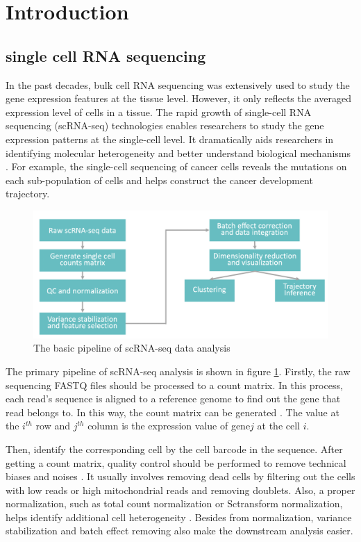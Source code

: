 \section{Introduction}

\subsection{single cell RNA sequencing}

In the past decades, bulk cell RNA sequencing was extensively used to study the gene expression features at the tissue level. However, it only reflects the averaged expression level of cells in a tissue. The rapid growth of single-cell RNA sequencing (scRNA-seq) technologies enables researchers to study the gene expression patterns at the single-cell level. It dramatically aids researchers in identifying molecular heterogeneity and better understand biological mechanisms \cite{shapiro2013single}. For example, the single-cell sequencing of cancer cells reveals the mutations on each sub-population of cells and helps construct the cancer development trajectory. 

\begin{figure}[htb!]
    \centering
    \includegraphics[width=1\textwidth]{figures/myfigures/scpip.png}
    \caption{The basic pipeline of scRNA-seq data analysis}
    \label{scpip}
\end{figure}

The primary pipeline of scRNA-seq analysis is shown in figure \ref{scpip}. Firstly, the raw sequencing FASTQ files should be processed to a count matrix. In this process, each read's sequence is aligned to a reference genome to find out the gene that read belongs to. In this way, the count matrix can be generated \cite{petukhov2017accurate}. The value at the $i^{th}$ row and $j^{th}$ column is the expression value of gene$j$ at the cell $i$.

Then, identify the corresponding cell by the cell barcode in the sequence. After getting a count matrix, quality control should be performed to remove technical biases and noises \cite{van2017single}. It usually involves removing dead cells by filtering out the cells with low reads or high mitochondrial reads and removing doublets. Also, a proper normalization, such as total count normalization or Sctransform normalization, helps identify additional cell heterogeneity \cite{vallejos2017normalizing}. Besides from normalization, variance stabilization and batch effect removing also make the downstream analysis easier.

